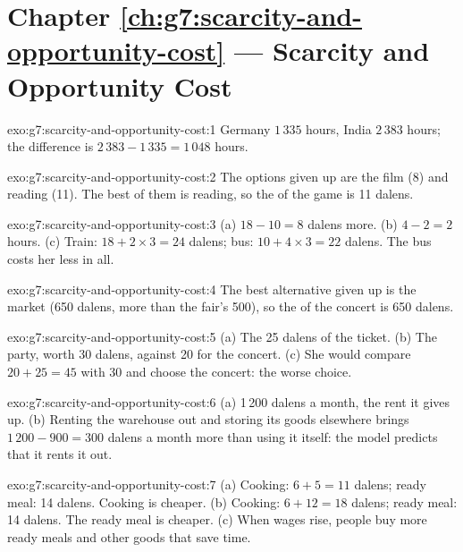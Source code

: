 \section*{Chapter \ref{ch:g7:scarcity-and-opportunity-cost} --- Scarcity and Opportunity Cost}

\begin{solution}{exo:g7:scarcity-and-opportunity-cost:1}
Germany $1\,335$ hours, India $2\,383$ hours; the difference is $2\,383 - 1\,335 =
1\,048$ hours.
\end{solution}

\begin{solution}{exo:g7:scarcity-and-opportunity-cost:2}
The options given up are the film (8) and reading (11). The best of them is reading,
so the  of the game is 11 dalens.
\end{solution}

\begin{solution}{exo:g7:scarcity-and-opportunity-cost:3}
(a) $18 - 10 = 8$ dalens more. (b) $4 - 2 = 2$ hours. (c) Train: $18 + 2 \times 3 = 24$
dalens; bus: $10 + 4 \times 3 = 22$ dalens. The bus costs her less in all.
\end{solution}

\begin{solution}{exo:g7:scarcity-and-opportunity-cost:4}
The best alternative given up is the market (650 dalens, more than the fair's 500), so
the  of the concert is 650 dalens.
\end{solution}

\begin{solution}{exo:g7:scarcity-and-opportunity-cost:5}
(a) The 25 dalens of the ticket. (b) The party, worth 30 dalens, against 20 for the
concert. (c) She would compare $20 + 25 = 45$ with 30 and choose the concert: the worse
choice.
\end{solution}

\begin{solution}{exo:g7:scarcity-and-opportunity-cost:6}
(a) 1\,200 dalens a month, the rent it gives up. (b) Renting the warehouse out and
storing its goods elsewhere brings $1\,200 - 900 = 300$ dalens a month more than
using it itself: the model predicts that it rents it out.
\end{solution}

\begin{solution}{exo:g7:scarcity-and-opportunity-cost:7}
(a) Cooking: $6 + 5 = 11$ dalens; ready meal: 14 dalens. Cooking is cheaper.
(b) Cooking: $6 + 12 = 18$ dalens; ready meal: 14 dalens. The ready meal is cheaper.
(c) When wages rise, people buy more ready meals and other goods that save time.
\end{solution}

